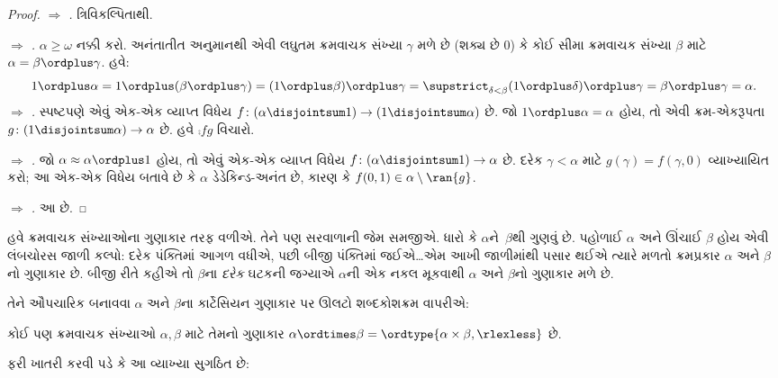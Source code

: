 \begin{proof}
\emph{ $\Rightarrow$ .}
ત્રિવિકલ્પિતાથી.

\emph{ $\Rightarrow$ .}
$\alpha \geq \omega$ નક્કી કરો. અનંતાતીત અનુમાનથી
એવી લઘુતમ ક્રમવાચક સંખ્યા $\gamma$ મળે છે
(શક્ય છે $0$) કે કોઈ સીમા ક્રમવાચક સંખ્યા $\beta$
માટે $\alpha = \beta \ordplus \gamma$. હવે:
\[
	1 \ordplus \alpha =
	1 \ordplus (\beta \ordplus \gamma) =
	(1 \ordplus \beta) \ordplus \gamma =
	\supstrict_{\delta < \beta} (1 \ordplus  \delta) \ordplus  \gamma =
	\beta \ordplus  \gamma =
	\alpha.
\]
\emph{ $\Rightarrow$ .}
સ્પષ્ટપણે એવું એક-એક વ્યાપ્ત વિધેય
$f \colon (\alpha \disjointsum 1) \to (1
\disjointsum \alpha)$ છે. જો $1 \ordplus \alpha = \alpha$
હોય, તો એવી ક્રમ-એકરૂપતા
$g \colon (1 \disjointsum \alpha) \to \alpha$
છે. હવે $\comp{f}{g}$ વિચારો.

\emph{ $\Rightarrow$ .}
જો $\alpha \approx \alpha \ordplus 1$ હોય, તો એવું
એક-એક વ્યાપ્ત વિધેય $f \colon
(\alpha \disjointsum 1) \to \alpha$ છે. દરેક
$\gamma < \alpha$ માટે $g(\gamma) = f(\gamma, 0)$
વ્યાખ્યાયિત કરો; આ એક-એક વિધેય બતાવે છે કે
$\alpha$ ડેડેકિન્ડ-અનંત છે, કારણ કે
$f(0,1) \in \alpha \setminus \ran{g}$.

\emph{ $\Rightarrow$ .}
આ  છે.
\end{proof}
\endgroup

\begingroup
\makeatletter{}\makeatother


\label{guunit:OLP-0578}


હવે ક્રમવાચક સંખ્યાઓના ગુણાકાર તરફ વળીએ. તેને પણ
સરવાળાની જેમ સમજીએ. ધારો કે $\alpha$ને~$\beta$થી
ગુણવું છે. પહોળાઈ $\alpha$ અને ઊંચાઈ $\beta$
હોય એવી લંબચોરસ જાળી કલ્પો: દરેક પંક્તિમાં આગળ
વધીએ, પછી બીજી પંક્તિમાં જઈએ\ldots એમ આખી
જાળીમાંથી પસાર થઈએ ત્યારે મળતો ક્રમપ્રકાર
$\alpha$ અને $\beta$નો ગુણાકાર છે. બીજી રીતે કહીએ
તો $\beta$ના \emph{દરેક} ઘટકની જગ્યાએ $\alpha$ની
એક નકલ મૂકવાથી $\alpha$ અને $\beta$નો ગુણાકાર
મળે છે.

તેને ઔપચારિક બનાવવા $\alpha$ અને $\beta$ના
કાર્ટેસિયન ગુણાકાર પર ઊલટો શબ્દકોશક્રમ વાપરીએ:

\begin{defn}
કોઈ પણ ક્રમવાચક સંખ્યાઓ $\alpha, \beta$ માટે
તેમનો ગુણાકાર $\alpha \ordtimes \beta = \ordtype{\alpha \times \beta, \rlexless}$ છે.
\end{defn}
\noindent
ફરી ખાતરી કરવી પડે કે આ વ્યાખ્યા સુગઠિત છે:

